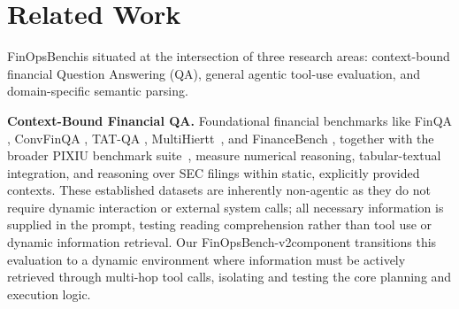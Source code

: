 \documentclass[11pt]{article}
\newcommand{\datasetname}{FinOpsBench}\xspace
\newcommand{\groundedfinqa}{FinOpsBench-v2}\xspace
\begin{document}

\section{Related Work}

\datasetname is situated at the intersection of three research areas: context-bound financial Question Answering (QA), general
agentic tool-use evaluation, and domain-specific semantic parsing.

\noindent \textbf{Context-Bound Financial QA.}
Foundational financial benchmarks like FinQA \citep{chen2021finqa}, ConvFinQA \citep{chen2022convfinqa}, TAT-QA \citep{zhu-etal-2021-tat}, MultiHiertt~\citep{zhao2022multihiertt}, and FinanceBench \citep{islam2023financebench}, together with the broader PIXIU benchmark suite~\citep{xie2023pixiu}, measure numerical reasoning, tabular-textual integration, and reasoning over SEC filings within static, explicitly provided contexts. These established datasets are inherently
non-agentic as they do not require dynamic interaction or external system calls; all necessary information is supplied in the prompt, testing reading comprehension rather than tool use or dynamic information retrieval. Our \groundedfinqa component transitions this
evaluation to a dynamic environment where information must be actively retrieved through multi-hop tool calls, isolating and
testing the core planning and execution logic.
\end{document}
